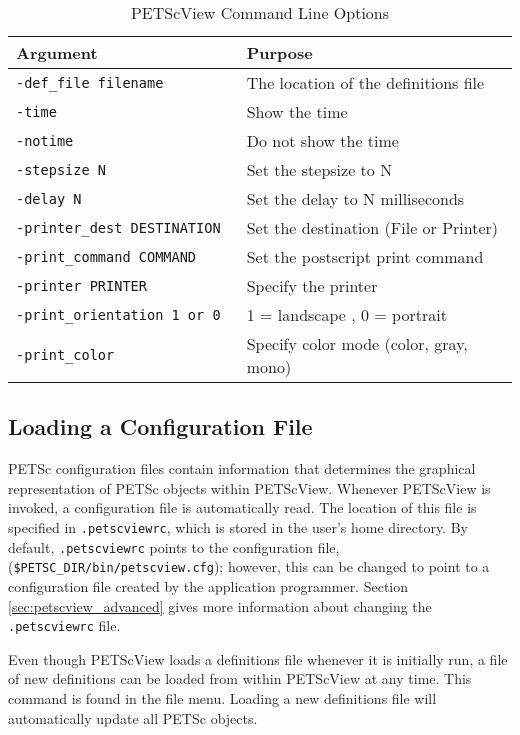 \begin{table}
\begin{center}
\begin{tabular}{ll}
{\bf Argument}                  & {\bf Purpose} \\
\hline
{\tt -def\_file filename}       & The location of the definitions file \\
{\tt -time}                    & Show the time \\
{\tt -notime}                  & Do not show the time \\
{\tt -stepsize N}              & Set the stepsize to N \\
{\tt -delay N}                 & Set the delay to N milliseconds \\
{\tt -printer\_dest DESTINATION}& Set the destination (File or Printer) \\
{\tt -print\_command COMMAND}   & Set the postscript print command \\
{\tt -printer PRINTER}         & Specify the printer \\
{\tt -print\_orientation 1 or 0} $\:\:\:$ & 1 = landscape , 0 = portrait \\
{\tt -print\_color}             & Specify color mode (color, gray, mono) \\
\hline
\end{tabular}
\end{center}
\caption{PETScView Command Line Options}
\label{PETScView_command_line_options}
\end{table}

\subsection{Loading a Configuration File}

PETSc configuration files contain information that
determines the graphical representation of PETSc objects within PETScView.
Whenever PETScView is invoked, a configuration file
is automatically read.  The location of this file is specified in
{\tt .petscviewrc}, which is stored in the user's home directory.  By
default, {\tt .petscviewrc} points to the configuration file,
({\tt \$PETSC\_DIR/bin/petscview.cfg}); however, this can be
changed to point to a configuration file created by the application
programmer.  Section \ref{sec:petscview_advanced} gives
more information about changing the {\tt .petscviewrc} file.

Even though PETScView loads a definitions file whenever it is
initially run, a file of new definitions can be loaded from within
PETScView at any time.  This command is found in the file menu.
Loading a new definitions file will automatically update all PETSc
objects.

